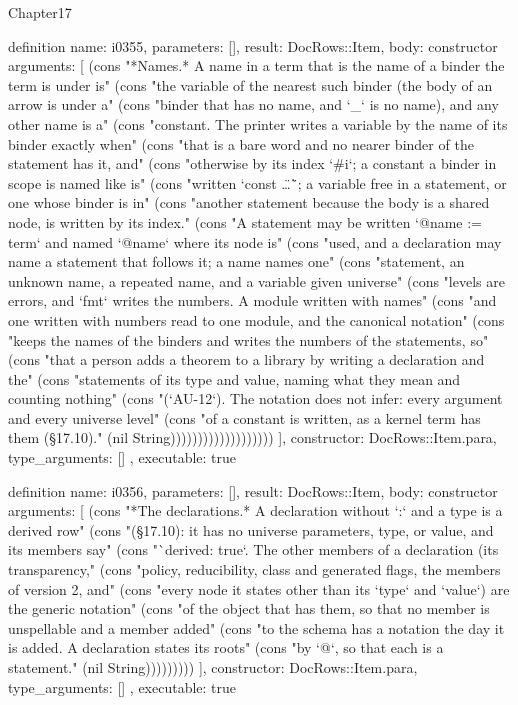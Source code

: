 \begin{lexlean}{Chapter17}
\begin{semanticmodule}
definition{
  name: i0355,
  parameters: [],
  result: DocRows::Item,
  body: constructor{
    arguments: [
      (cons "*Names.* A name in a term that is the name of a binder the term is under is" (cons "the variable of the nearest such binder (the body of an arrow is under a" (cons "binder that has no name, and `_` is no name), and any other name is a" (cons "constant. The printer writes a variable by the name of its binder exactly when" (cons "that is a bare word and no nearer binder of the statement has it, and" (cons "otherwise by its index `#i`; a constant a binder in scope is named like is" (cons "written `const \"…\"`; a variable free in a statement, or one whose binder is in" (cons "another statement because the body is a shared node, is written by its index." (cons "A statement may be written `@name := term` and named `@name` where its node is" (cons "used, and a declaration may name a statement that follows it; a name names one" (cons "statement, an unknown name, a repeated name, and a variable given universe" (cons "levels are errors, and `fmt` writes the numbers. A module written with names" (cons "and one written with numbers read to one module, and the canonical notation" (cons "keeps the names of the binders and writes the numbers of the statements, so" (cons "that a person adds a theorem to a library by writing a declaration and the" (cons "statements of its type and value, naming what they mean and counting nothing" (cons "(`AU-12`). The notation does not infer: every argument and every universe level" (cons "of a constant is written, as a kernel term has them (§17.10)." (nil String)))))))))))))))))))
    ],
    constructor: DocRows::Item.para,
    type_arguments: []
  },
  executable: true
}

definition{
  name: i0356,
  parameters: [],
  result: DocRows::Item,
  body: constructor{
    arguments: [
      (cons "*The declarations.* A declaration without `:` and a type is a derived row" (cons "(§17.10): it has no universe parameters, type, or value, and its members say" (cons "`derived: true`. The other members of a declaration (its transparency," (cons "policy, reducibility, class and generated flags, the members of version 2, and" (cons "every node it states other than its `type` and `value`) are the generic notation" (cons "of the object that has them, so that no member is unspellable and a member added" (cons "to the schema has a notation the day it is added. A declaration states its roots" (cons "by `@`, so that each is a statement." (nil String)))))))))
    ],
    constructor: DocRows::Item.para,
    type_arguments: []
  },
  executable: true
}


\end{semanticmodule}
\end{lexlean}
